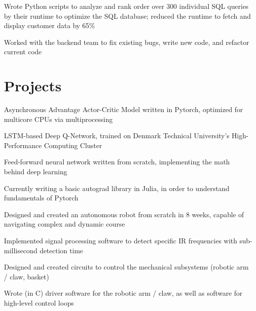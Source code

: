 \documentclass[]{deedy-resume-openfont}
\begin{document}
\vspace{8pt}

\begin{tightemize}
    \item Wrote Python scripts to analyze and rank order over 300 individual SQL queries by their runtime to optimize the SQL database; reduced the runtime to fetch and display customer data by 65\%
    \item Worked with the backend team to fix existing bugs, write new code, and refactor current code
\end{tightemize}

\vspace{12pt}


\section{Projects}

\begin{tightemize}
    \item Asynchronous Advantage Actor-Critic Model written in Pytorch, optimized for multicore CPUs via multiprocessing
    \item LSTM-based Deep Q-Network, trained on Denmark Technical University's High-Performance Computing Cluster
    \item Feed-forward neural network written from scratch, implementing the math behind deep learning
    \item Currently writing a basic autograd library in Julia, in order to understand fundamentals of Pytorch
\end{tightemize}

\vspace{8pt}

\begin{tightemize}
    \item Designed and created an autonomous robot from scratch in 8 weeks, capable of navigating complex and dynamic course
    \item Implemented signal processing software to detect specific IR frequencies with sub-millisecond detection time
    \item Designed and created circuits to control the mechanical subsystems (robotic arm / claw, basket)
    \item Wrote (in C) driver software for the robotic arm / claw, as well as software for high-level control loops
\end{tightemize}
\end{document}
